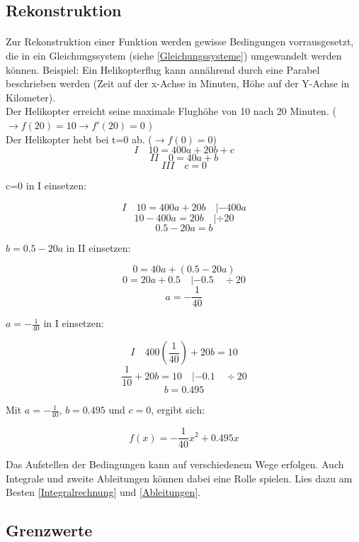 \documentclass{article}
\begin{document}
	\subsection{Rekonstruktion}\label{Rekonstruktion}
		\paragraph{}
			Zur Rekonstruktion einer Funktion werden gewisse Bedingungen vorrausgesetzt, die in ein Gleichungssystem (siehe \ref{Gleichungssysteme}) umgewandelt werden können.
			Beispiel: Ein Helikopterflug kann annährend durch eine Parabel beschrieben werden (Zeit auf der x-Achse in Minuten, Höhe auf der Y-Achse in Kilometer). \\
			Der Helikopter erreicht seine maximale Flughöhe von 10 nach 20 Minuten. ( $ \rightarrow f(20)=10 \rightarrow f'(20)=0 $ ) \\
			Der Helikopter hebt bei t=0 ab. ($ \rightarrow f(0)=0$) \\
			
			\[ I \quad 10=400a+20b+c \]
			\[ II \quad 0=40a+b \]
			\[ III \quad c=0 \]
			
			c=0 in I einsetzen:
			
			\[I \quad 10=400a+20b \quad |-400a \]
			\[ 10-400a=20b \quad | \div 20\]
			\[ 0.5-20a=b\]
			
			$b= 0.5-20a $ in II einsetzen:
			
			\[ 0=40a+(0.5-20a)\]
			\[ 0=20a+0.5 \quad |-0.5 \quad \div 20\]
			\[ a=-\frac{1}{40} \]
			
			$a=-\frac{1}{40}$ in I einsetzen:
			
			\[ I \quad 400(\frac{1}{40})+20b=10 \]
			\[ \frac{1}{10}+20b=10 \quad |-0.1 \quad \div 20\]
			\[ b=0.495\]
			
			Mit $a=-\frac{1}{40}$, $b=0.495$ und $c=0$, ergibt sich:
			
			\[f(x)=-\frac{1}{40}x^2+0.495x\]
			
			Das Aufstellen der Bedingungen kann auf verschiedenem Wege erfolgen. Auch Integrale und zweite Ableitungen können dabei eine Rolle spielen.
			Lies dazu am Besten \ref{Integralrechnung} und \ref{Ableitungen}.


	\subsection{Grenzwerte}
\end{document}
